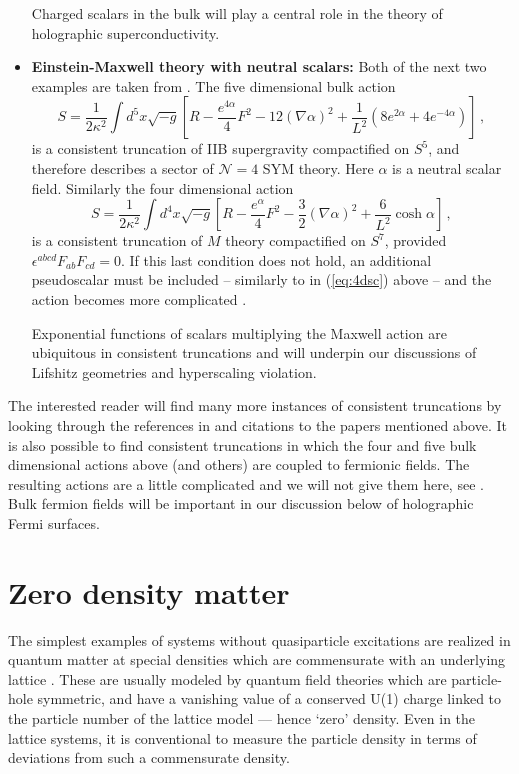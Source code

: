 \documentclass[10pt, oneside]{book}
\def\be{\begin{equation}}
\def\ee{\end{equation}}
\begin{document}
\begin{doublespace}
\begin{itemize}
Charged scalars in the bulk will play a central role in the theory of holographic superconductivity.

\item {\bf Einstein-Maxwell theory with neutral scalars:} Both of the next two examples are taken from \cite{Cvetic:1999xp, Gubser:2009qt}. The five dimensional bulk action
\be
S = \frac{1}{2 \kappa^2} \int d^5x \sqrt{-g} \left[  R  - \frac{e^{4 \alpha}}{4} F^2 - 12 \left(\nabla \alpha \right)^2 + \frac{1}{L^2} \left(8 e^{2 \alpha} + 4 e^{- 4 \alpha} \right) \right] \,,
\ee
is a consistent truncation of IIB supergravity compactified on $S^5$, and therefore describes a sector of ${\mathcal N}=4$ SYM theory. Here $\alpha$ is a neutral scalar field. Similarly the four dimensional action
\be
S = \frac{1}{2 \kappa^2} \int d^4x \sqrt{-g} \left[  R  - \frac{e^{\alpha}}{4} F^2 - \frac{3}{2} \left(\nabla \alpha \right)^2 + \frac{6}{L^2} \cosh \alpha \right] \,,
\ee
is a consistent truncation of $M$ theory compactified on $S^7$, provided $\epsilon^{abcd} F_{ab} F_{cd} = 0$. If this last condition does not hold, an additional pseudoscalar must be included -- similarly to in (\ref{eq:4dsc}) above -- and the action becomes more complicated \cite{Cvetic:1999xp}.

Exponential functions of scalars multiplying the Maxwell action are ubiquitous in consistent truncations and will underpin  our discussions of Lifshitz geometries and hyperscaling violation.

\end{itemize}

The interested reader will find many more instances of consistent truncations by looking through the references in and citations to the papers mentioned above. It is also possible to find consistent truncations in which the four and five bulk dimensional actions above (and others) are coupled to fermionic fields. The resulting actions are a little complicated and we will not give them here, see \cite{Gauntlett:2011mf, Belliard:2011qq, Gauntlett:2011wm, DeWolfe:2011aa, DeWolfe:2012uv, DeWolfe:2014ifa}. Bulk fermion fields will be important in our discussion below of holographic Fermi surfaces.


\section{Zero density matter}
\label{sec:zerodensity}

The simplest examples of systems without quasiparticle excitations are realized in quantum matter at special densities which are commensurate with an underlying lattice \cite{ssbook}. These are usually modeled by quantum field theories which are particle-hole symmetric, and have a vanishing value of a conserved U(1) charge linked to the particle number of the lattice model --- hence `zero' density. Even in the lattice systems, it is conventional to measure the particle
density in terms of deviations from such a commensurate density.


\end{doublespace}
\end{document}
